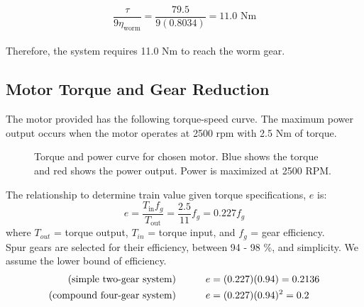 \documentclass[letterpaper,12pt]{article}
\begin{document}
$$\frac{\tau }{9 \eta_{\text{worm}}} = \frac{79.5}{9(0.8034)} = 11.0 \text{ Nm}$$
\\
Therefore, the system requires 11.0 Nm to reach the worm gear. 

\subsection{Motor Torque and Gear Reduction}
The motor provided has the following torque-speed curve. The maximum power output occurs when the motor operates at 2500 rpm with 2.5 Nm of torque. \\

\begin{figure}[htbp] 
    \centering 
{}
\caption{Torque and power curve for chosen motor. Blue shows the torque and red shows the power output. Power is maximized at 2500 RPM.}
\end{figure}
\noindent The relationship to determine train value given torque specifications, $e$ is:
\begin{equation}
e = \frac{T_{\text{in}}f_{g}}{T_{\text{out}}} = \frac{2.5}{11} f_{g} = 0.227f_g
\end{equation}
where $T_{out}$ = torque output, $T_{in}$ = torque input, and $f_g$ = gear efficiency. \\
Spur gears are selected for their efficiency, between 94 - 98 \%, and simplicity. We assume the lower bound of efficiency. 
\begin{eqnarray}
\text{(simple two-gear system)}    \indent\indent &e = (0.227)(0.94) = 0.2136\\
\text{(compound four-gear system)} \indent\indent &e = (0.227)(0.94)^2 = 0.2 
\end{eqnarray}
\end{document}
